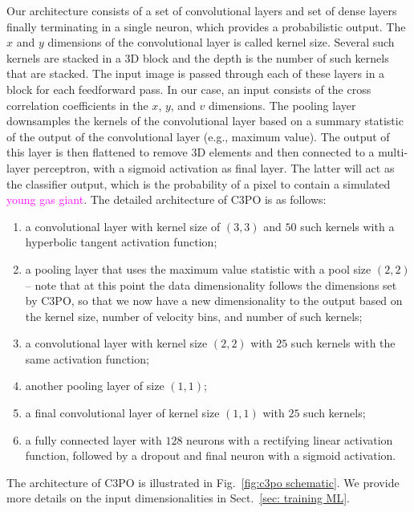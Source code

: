 \documentclass[referee]{aa} %
\newcommand{\newchange}[1]{\textcolor{magenta}{#1}}
\begin{document}
Our architecture consists of a set of convolutional layers and set of dense layers finally terminating in a single neuron, which provides a probabilistic output.
The $x$ and $y$ dimensions of the convolutional layer is called kernel size.
Several such kernels are stacked in a 3D block and the depth is the number of such kernels that are stacked.
The input image is passed through each of these layers in a block for each feedforward pass.
In our case, an input consists of the cross correlation coefficients in the $x$, $y$, and $v$ dimensions.
The pooling layer downsamples the kernels of the convolutional layer based on a summary statistic of the output of the convolutional layer (e.g., maximum value).
The output of this layer is then flattened to remove 3D elements and then connected to a multi-layer perceptron, with a sigmoid activation as final layer. 
The latter will act as the classifier output, which is the probability of a pixel to contain a simulated \newchange{young gas giant}. The detailed architecture of C3PO is as follows:
\begin{enumerate}
    \item a convolutional layer with kernel size of $\left(3,3\right)$ and $50$ such kernels with a hyperbolic tangent activation function;
    \item a pooling layer that uses the maximum value statistic with a pool size $(2,2)$ -- note that at this point the data dimensionality follows the dimensions set by C3PO, so that we now have a new dimensionality to the output based on the kernel size, number of velocity bins, and number of such kernels;
    \item a convolutional layer with kernel size $\left(2,2\right)$ with $25$ such kernels with the same activation function;
    \item another pooling layer of size $(1,1)$;
    \item a final convolutional layer of kernel size $(1,1)$ with $25$ such kernels;
    \item a fully connected layer with $128$ neurons with a rectifying linear activation function, followed by a dropout and final neuron with a sigmoid activation.
\end{enumerate}
The architecture of C3PO is illustrated in Fig.~\ref{fig:c3po schematic}. We provide more details on the input dimensionalities in Sect.~\ref{sec: training ML}.
\end{document}
